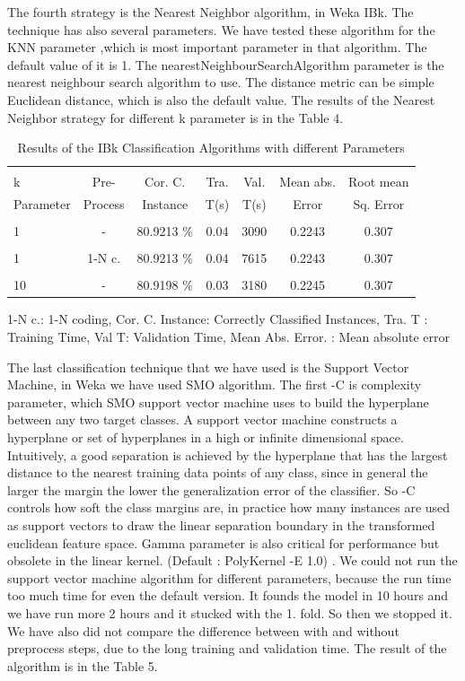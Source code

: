 \documentclass[a4paper]{article}
\begin{document}
The fourth strategy is the  Nearest Neighbor algorithm, in Weka IBk. The technique has also several parameters. We have tested these algorithm for the KNN parameter ,which is most important parameter in that algorithm. The default value of it is 1. The nearestNeighbourSearchAlgorithm parameter is the nearest neighbour search algorithm to use. The distance metric can be simple Euclidean distance, which is also the default value. The results of the  Nearest Neighbor  strategy for different k parameter is in the Table 4.

\begin{table}
\begin{tabular}{|l| c | c | c | c |c |c |}

\hline & & & & & & \\
k &  Pre- & Cor. C. & Tra. & Val. & Mean abs.  & Root mean \\
Parameter& Process & Instance & T(s) &  T(s) & Error & Sq. Error \\
\hline & & & & & & \\
1 	 & - &			80.9213		   $\%$ &	0.04		& 	3090	 & 	0.2243	 & 0.307  \\ 
\hline & & & & & & \\	
1 	 & 1-N c.  &		 80.9213		   $\%$ &	0.04		& 	7615	 & 	 0.2243	 &  0.307  \\ 
\hline & & & & & & \\	
10	 & - &		  	80.9198		 $\%$ &	0.03		& 	3180  	&	0.2245	 & 	0.307 	  \\ 
\hline
\end{tabular}
\caption{Results of the IBk Classification Algorithms with different Parameters}
	 1-N c.: 1-N coding,
	Cor. C. Instance:  Correctly Classified Instances,
	Tra. T : Training Time,
	Val T: Validation Time,
	Mean Abs. Error. : Mean absolute error 
\end{table}

The last classification technique that we have used is the Support Vector Machine, in Weka we have used SMO algorithm. The first -C is complexity parameter, which SMO support vector machine uses to build the hyperplane between any two target classes. A support vector machine constructs a hyperplane or set of hyperplanes in a high or infinite dimensional space. Intuitively, a good separation is achieved by the hyperplane that has the largest distance to the nearest training data points of any class, since in general the larger the margin the lower the generalization error of the classifier. So -C controls how soft the class margins are, in practice how many instances are used as support vectors to draw the linear separation boundary in the transformed euclidean feature space. Gamma parameter is also critical for performance but obsolete in the linear kernel. (Default : PolyKernel -E 1.0) . We could not run the support vector machine algorithm for different parameters, because the run time too much time for even the default version. It founds the model in 10 hours and we have run more 2 hours and it stucked with the 1. fold. So then we stopped it. We have also did not  compare the difference between with and without preprocess steps, due to the long training and validation time. The result of the algorithm is in the Table 5.
\end{document}
